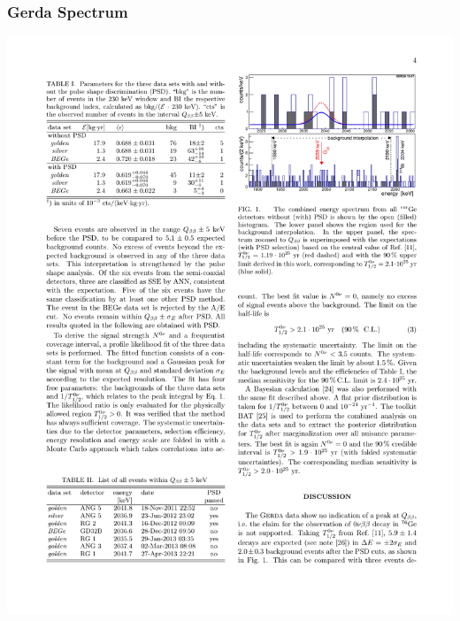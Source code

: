 \documentclass{beamer}
\begin{document}
\begin{frame}
\begin{center}
\frametitle{Gerda Spectrum}
\end{center}
\begin{center}
\includegraphics[keepaspectratio=true,width=\textwidth]{Gerda_spectrum.pdf}
\end{center}
\end{frame}
\end{document}
